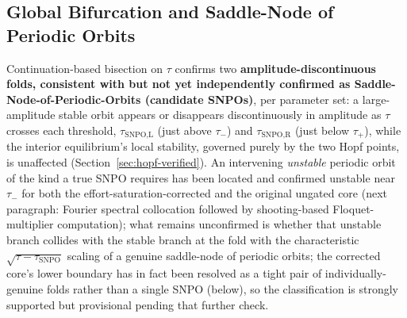 \documentclass[twocolumn,10pt]{article}
\begin{document}
\subsection{Global Bifurcation and Saddle-Node of Periodic Orbits}
Continuation-based bisection on $\tau$ confirms two \textbf{amplitude-discontinuous folds, consistent with but not yet independently confirmed as Saddle-Node-of-Periodic-Orbits (candidate SNPOs)}, per parameter set: a large-amplitude stable orbit appears or disappears discontinuously in amplitude as $\tau$ crosses each threshold, $\tau_{\text{SNPO,L}}$ (just above $\tau_-$) and $\tau_{\text{SNPO,R}}$ (just below $\tau_+$), while the interior equilibrium's local stability, governed purely by the two Hopf points, is unaffected (Section~\ref{sec:hopf-verified}). An intervening \emph{unstable} periodic orbit of the kind a true SNPO requires has been located and confirmed unstable near $\tau_-$ for both the effort-saturation-corrected and the original ungated core (next paragraph: Fourier spectral collocation followed by shooting-based Floquet-multiplier computation); what remains unconfirmed is whether that unstable branch collides with the stable branch at the fold with the characteristic $\sqrt{\tau-\tau_{\text{SNPO}}}$ scaling of a genuine saddle-node of periodic orbits; the corrected core's lower boundary has in fact been resolved as a tight pair of individually-genuine folds rather than a single SNPO (below), so the classification is strongly supported but provisional pending that further check.
\end{document}
